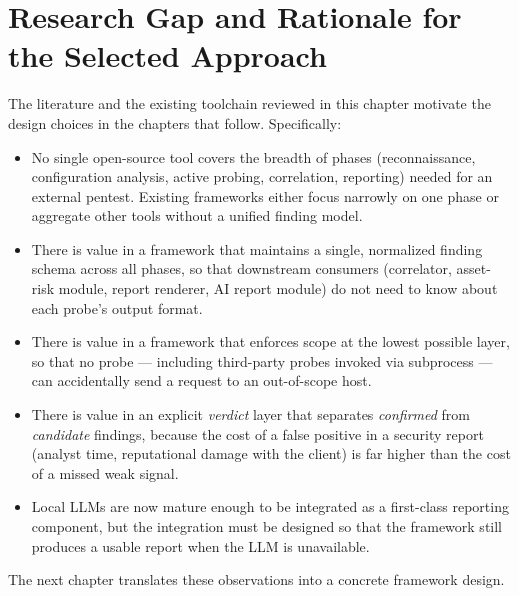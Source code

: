 \section{Research Gap and Rationale for the Selected Approach}

The literature and the existing toolchain reviewed in this chapter motivate the design choices in the chapters that follow. Specifically:

\begin{itemize}
  \item No single open-source tool covers the breadth of phases (reconnaissance, configuration analysis, active probing, correlation, reporting) needed for an external pentest. Existing frameworks either focus narrowly on one phase or aggregate other tools without a unified finding model.
  \item There is value in a framework that maintains a single, normalized finding schema across all phases, so that downstream consumers (correlator, asset-risk module, report renderer, AI report module) do not need to know about each probe's output format.
  \item There is value in a framework that enforces scope at the lowest possible layer, so that no probe --- including third-party probes invoked via subprocess --- can accidentally send a request to an out-of-scope host.
  \item There is value in an explicit \textit{verdict} layer that separates \textit{confirmed} from \textit{candidate} findings, because the cost of a false positive in a security report (analyst time, reputational damage with the client) is far higher than the cost of a missed weak signal.
  \item Local LLMs are now mature enough to be integrated as a first-class reporting component, but the integration must be designed so that the framework still produces a usable report when the LLM is unavailable.
\end{itemize}

The next chapter translates these observations into a concrete framework design.
